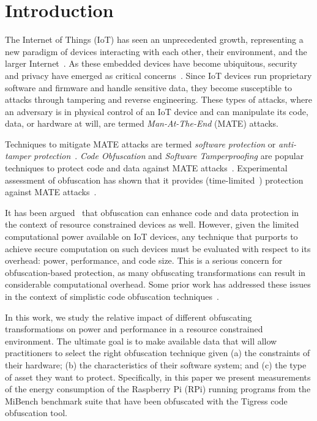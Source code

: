 \section{Introduction}
The Internet of Things (IoT) has seen an unprecedented growth, representing a new paradigm of devices interacting with each other, their environment, and the larger Internet~\cite{ATZORI20102787}. As these embedded devices have become ubiquitous, security and privacy have emerged as critical concerns~\cite{weber2010internet,7054433}. Since IoT devices run proprietary software and firmware and handle sensitive data, they become susceptible to attacks through tampering and reverse engineering. These types of attacks, where an adversary is in physical control of an IoT device and can manipulate its code, data, or hardware at will, are termed {\em Man-At-The-End} (MATE) attacks. 

Techniques to mitigate MATE attacks are termed {\em software protection} or {\em anti-tamper protection}~\cite{falcarin2011guest}. {\em Code Obfuscation} and {\em Software Tamperproofing} are popular techniques to protect code and data against MATE attacks~\cite{collberg_surreptitious_2010}. Experimental assessment of obfuscation has shown that it provides (time-limited~\cite{hohl98time}) protection against MATE attacks~\cite{5090041,7781792}.

It has been argued~\cite{Hosseinzadeh2015} that obfuscation can enhance code and data protection in the context of resource constrained devices as well. However, given the limited computational power available on IoT devices, any technique that purports to achieve secure computation on such devices must be evaluated with respect to its overhead: power, performance, and code size. This is a serious concern for obfuscation-based protection, as many obfuscating transformations can result in considerable computational overhead. Some prior work has addressed these issues in the context of simplistic code obfuscation techniques~\cite{6976079,dhukovic2015load,raj2017modelling}.

In this work, we study the relative impact of different obfuscating transformations on power and performance in a resource constrained environment. The ultimate goal is to make available data that will allow practitioners to select the right obfuscation technique given (a) the constraints of their hardware; (b) the characteristics of their software system; and (c) the type of asset they want to protect. Specifically, in this paper we present measurements of the energy consumption of the Raspberry Pi (RPi) running programs from the MiBench benchmark suite that have been obfuscated with the Tigress code obfuscation tool. 

